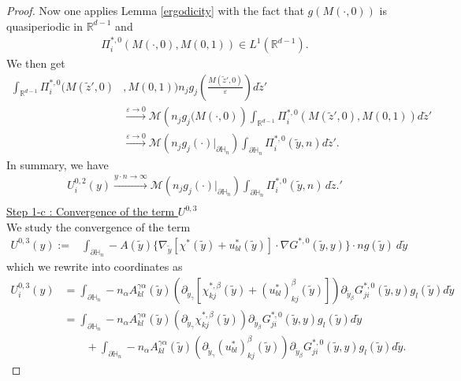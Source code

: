 \documentclass[11pt, reqno]{amsart}
\theoremstyle{definition}
\theoremstyle{remark}
\numberwithin{equation}{section}
\begin{document}
\begin{proof}[Proof]
		\noindent Now one applies Lemma \ref{ergodicity} with the fact that $g(M(\cdot,0))$ is quasiperiodic in $\mathbb{R}^{d-1}$ and
		\begin{align*}
			\Pi^{*,0}_i\left(M(\cdot,0),M (0,1) \right) \in L^1(\mathbb{R}^{d-1}).
		\end{align*}
		We then get
		\begin{align}
			\int_{\mathbb{R}^{d-1}} \Pi^{*,0}_i(M(\tilde{z}',0)&,M (0,1) ) n_j g_j\left(\!\frac{M(\tilde{z}',0)}{\varepsilon }\right)d\tilde{z}'\nonumber\\ &\xrightarrow{\varepsilon\rightarrow 0} \mathcal{M} \left( n_j g_j(M(\cdot ,0)\right)\int_{\mathbb{R}^{d-1}} \Pi^{*,0}_i\left(M(\tilde{z}',0),M (0,1) \right) d\tilde{z}'\nonumber\\
			&\xrightarrow{\varepsilon\rightarrow 0} \mathcal{M} \left( n_j g_j(\cdot )|_{\partial\mathbb{H}_n} \right)\int_{\partial\mathbb{H}_n} \Pi^{*,0}_i\left(\tilde{y},n\right) d\tilde{z}'. \nonumber
		\end{align}
		In summary, we have 
		\begin{align}
			U_i^{0,2}(y)\xrightarrow{y\cdot n\rightarrow \infty} \mathcal{M} \left( n_j g_j(\cdot )|_{\partial\mathbb{H}_n} \right)\int_{\partial\mathbb{H}_n} \Pi^{*,0}_i\left(\tilde{y},n\right) \,d\tilde{z}.'\label{convblp2}\\\nonumber
		\end{align}
	\noindent	\underline{Step 1-c : 	Convergence of the term $U^{0,3}$ }\\
		We study the convergence of the term 
		\begin{align*}
			U^{0,3}(y):=&\int_{\partial\mathbb{H}_n}-A(\tilde{y}) \{\nabla_{\!\tilde{y}}\left[\chi^* \left(\tilde{y} \right)+ u_{bl}^*\left(\tilde{y} \right)\right] \cdot \nabla G^{*,0}\left(\tilde{y},y\right)\}\cdot n g(\tilde{y}) \   d\tilde{y} 
		\end{align*}
		which we rewrite  into coordinates as
		\begin{align*}
			U_i^{0,3}(y)
			&= \int_{\partial\mathbb{H}_n}-n_\alpha A^{\gamma\alpha}_{kl}(\tilde{y})\left(\partial_{ \tilde{y}_\gamma} [\chi_{kj}^{*,\beta}\left(\tilde{y} \right) + (u^*_{bl})^{\beta}_{kj}\left(\tilde{y} \right)]\right) \partial_{ \tilde{y}_\beta} G^{*,0}_{ji}\left(\tilde{y},y\right)  g_l(\tilde{y}) d\tilde{y}\\
			&=\int_{\partial\mathbb{H}_n}-n_\alpha A^{\gamma\alpha}_{kl}(\tilde{y})\left(\partial_{ \tilde{y}_\gamma} \chi_{kj}^{*,\beta}\left(\tilde{y} \right)  \right) \partial_{ \tilde{y}_\beta} G^{*,0}_{ji}\left(\tilde{y},y\right)  g_l(\tilde{y}) d\tilde{y}\\&\qquad +\int_{\partial\mathbb{H}_n}-n_\alpha A^{\gamma\alpha}_{kl}(\tilde{y})\left(\partial_{ \tilde{y}_\gamma}  (u^*_{bl})^{\beta}_{kj}(\tilde{y})\right) \partial_{ \tilde{y}_\beta} G^{*,0}_{ji}\left(\tilde{y},y\right)  g_l(\tilde{y}) d\tilde{y}.

\end{align*}
\end{proof}
\end{document}
